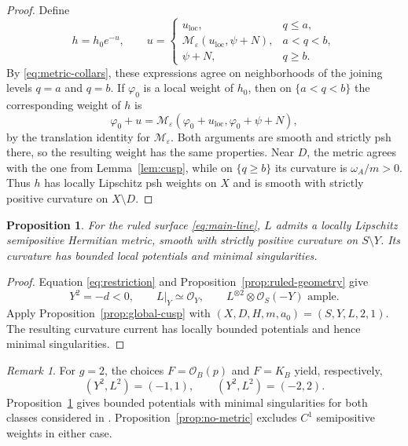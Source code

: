 \documentclass[11pt]{amsart}
\newtheorem{proposition}[theorem]{Proposition}
\theoremstyle{definition}
\theoremstyle{remark}
\newtheorem{remark}{Remark}[section]
\numberwithin{equation}{section}
\newcommand{\OO}{\mathcal O}
\begin{document}
\begin{proof}
Define
\begin{equation}\label{eq:global-metric}
 h=h_0e^{-u},\qquad
 u=
 \begin{cases}
 u_{\mathrm{loc}},&q\le a,\\
 \mathcal M_\varepsilon(u_{\mathrm{loc}},\psi+N),
   &a<q<b,\\
 \psi+N,&q\ge b.
 \end{cases}
\end{equation}
By \eqref{eq:metric-collars}, these expressions agree
on neighborhoods of the joining levels $q=a$ and $q=b$.
If $\varphi_0$ is a local weight of $h_0$, then on
$\{a<q<b\}$ the corresponding weight of $h$ is
\[
 \varphi_0+u
 =\mathcal M_\varepsilon
  (\varphi_0+u_{\mathrm{loc}},\varphi_0+\psi+N),
\]
by the translation identity for $\mathcal M_\varepsilon$.
Both arguments are smooth and strictly psh there, so
the resulting weight has the same properties.
Near $D$, the metric agrees with the one from
Lemma~\ref{lem:cusp}, while on $\{q\ge b\}$ its curvature
is $\omega_A/m>0$.
Thus $h$ has locally Lipschitz psh weights on $X$
and is smooth with strictly positive curvature
on $X\setminus D$.
\end{proof}

\begin{proposition}\label{prop:continuous-metric}\label{sec:global}
For the ruled surface \eqref{eq:main-line}, $L$ admits a locally
Lipschitz semipositive Hermitian metric, smooth with strictly
positive curvature on $S\setminus Y$. Its curvature has bounded
local potentials and minimal singularities.
\end{proposition}
\begin{proof}
Equation \eqref{eq:restriction} and
Proposition~\ref{prop:ruled-geometry} give
\[
 Y^2=-d<0,\qquad L|_Y\simeq\OO_Y,\qquad
 L^{\otimes2}\otimes\OO_S(-Y)\text{ ample}.
\]
Apply Proposition~\ref{prop:global-cusp} with
$(X,D,H,m,a_0)=(S,Y,L,2,1)$. The resulting curvature current
has locally bounded potentials and hence minimal singularities.
\end{proof}

\begin{remark}\label{rem:minimal}
For $g=2$, the choices $F=\OO_B(p)$ and $F=K_B$ yield, respectively,
\[
 (Y^2,L^2)=(-1,1),\qquad (Y^2,L^2)=(-2,2).
\]
Proposition~\ref{prop:continuous-metric} gives bounded potentials
with minimal singularities for both classes considered in
\cite[Section~4]{Zhang2025}. Proposition~\ref{prop:no-metric}
excludes $C^1$ semipositive weights in either case.
\end{remark}
\end{document}
